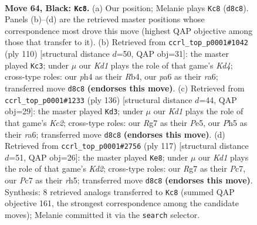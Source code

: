 \documentclass[11pt]{article}
\begin{document}
\clearpage

\begin{figure}[p]\centering
\begin{subfigure}{0.46\textwidth}\centering
\resizebox{\linewidth}{!}{%
\newchessgame
\chessboard[
  setfen={1r1k2b1/p1p3r1/P1p3p1/2P2p1p/RP3P1P/7R/5K2/1N6 b - - 51 64},
  showmover=false,
  pgfstyle=straightmove, color=movearrow, markmove={d8-c8}
]}
\caption{}
\end{subfigure}\hfill
\begin{subfigure}{0.46\textwidth}\centering
\resizebox{\linewidth}{!}{%
\newchessgame
\chessboard[
  setfen={6r1/3pk3/r3p1p1/4P2p/PR1K1P1P/1P4R1/8/8 w - - 7 56},
  showmover=false,
  pgfstyle=straightmove, color=movearrow, markmove={d4-c3}
]}
\caption{}
\end{subfigure}
\\[4pt]
\begin{subfigure}{0.46\textwidth}\centering
\resizebox{\linewidth}{!}{%
\newchessgame
\chessboard[
  setfen={8/p4k2/r1p1p3/1p2Pp2/1P1P2p1/P1R3P1/2K2P1r/5R2 w - - 6 69},
  showmover=false,
  pgfstyle=straightmove, color=movearrow, markmove={c2-d3}
]}
\caption{}
\end{subfigure}\hfill
\begin{subfigure}{0.46\textwidth}\centering
\resizebox{\linewidth}{!}{%
\newchessgame
\chessboard[
  setfen={8/2pk1r2/1p1p4/pP5R/P1PPr1p1/6P1/5P2/3R1K2 b - - 0 59},
  showmover=false,
  pgfstyle=straightmove, color=movearrow, markmove={d7-e8}
]}
\caption{}
\end{subfigure}
\caption{\textbf{Move 64, Black: \texttt{Kc8}.} (a) Our position; Melanie plays \texttt{Kc8} (\texttt{d8c8}). Panels (b)--(d) are the retrieved master positions whose correspondence most drove this move (highest QAP objective among those that transfer to it). (b) Retrieved from \texttt{ccrl\_top\_p0001\#1042} (ply 110) [structural distance $d$=50, QAP obj=31]: the master played \texttt{Kc3}; under $\mu$ our \emph{Kd1} plays the role of that game's \emph{Kd4}; cross-type roles: our \emph{p}h4 as their \emph{R}b4, our \emph{p}a6 as their \emph{r}a6; transferred move \texttt{d8c8} \textbf{(endorses this move)}. (c) Retrieved from \texttt{ccrl\_top\_p0001\#1233} (ply 136) [structural distance $d$=44, QAP obj=29]: the master played \texttt{Kd3}; under $\mu$ our \emph{Kd1} plays the role of that game's \emph{Kc2}; cross-type roles: our \emph{R}g7 as their \emph{P}e5, our \emph{P}h5 as their \emph{r}a6; transferred move \texttt{d8c8} \textbf{(endorses this move)}. (d) Retrieved from \texttt{ccrl\_top\_p0001\#2756} (ply 117) [structural distance $d$=51, QAP obj=26]: the master played \texttt{Ke8}; under $\mu$ our \emph{Kd1} plays the role of that game's \emph{Kd2}; cross-type roles: our \emph{R}g7 as their \emph{P}c7, our \emph{P}c7 as their \emph{r}h5; transferred move \texttt{d8c8} \textbf{(endorses this move)}. Synthesis: 8 retrieved analogs transferred to \texttt{Kc8} (summed QAP objective 161, the strongest correspondence among the candidate moves); Melanie committed it via the \texttt{search} selector.}
\label{fig:thought-m127}
\end{figure}
\end{document}
